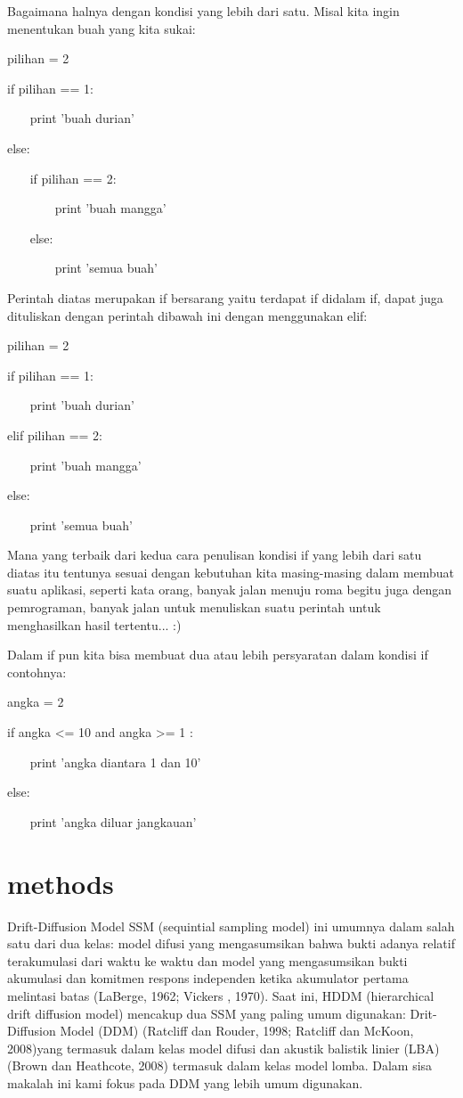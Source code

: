  
Bagaimana halnya dengan kondisi yang lebih dari satu. Misal kita ingin menentukan buah yang kita sukai: 

 
pilihan = 2 

 
if pilihan == 1: 

 
~~~ print 'buah durian' 

 
else: 

 
~~~ if pilihan == 2: 

 
~~~~~~~ print 'buah mangga' 

 
~~~ else: 

 
~~~~~~~ print 'semua buah' 

 
Perintah diatas merupakan if bersarang yaitu terdapat if didalam if, dapat juga dituliskan dengan perintah dibawah ini dengan menggunakan   elif: 

 
pilihan = 2 

 
if pilihan == 1: 

 
~~~ print 'buah durian' 

 
elif pilihan == 2: 

 
~~~ print 'buah mangga' 

 
else: 

 
~~~ print 'semua buah' 

 
Mana yang terbaik dari kedua cara penulisan kondisi if yang lebih dari satu diatas itu tentunya sesuai dengan kebutuhan kita masing-masing dalam membuat suatu aplikasi, seperti kata orang, banyak jalan menuju roma begitu juga dengan pemrograman, banyak jalan untuk menuliskan suatu perintah untuk menghasilkan hasil tertentu... :) 

 
Dalam if pun kita bisa membuat dua atau lebih persyaratan dalam kondisi   if   contohnya: 

 
angka = 2 

 
if angka <= 10 and angka >= 1 : 

 
~~~ print 'angka diantara 1 dan 10' 

 
else: 

 
~~~ print 'angka diluar jangkauan' 

\section {methods}
Drift-Diffusion Model
SSM (sequintial sampling model) ini umumnya dalam salah satu dari dua kelas: 
model difusi yang mengasumsikan bahwa bukti adanya relatif terakumulasi dari waktu ke waktu dan model yang mengasumsikan bukti
akumulasi dan komitmen respons independen ketika akumulator pertama melintasi batas (LaBerge, 1962; Vickers , 1970). 
Saat ini, HDDM (hierarchical drift diffusion model) mencakup dua SSM yang paling umum digunakan: Drit-Diffusion Model (DDM)
(Ratcliff dan Rouder, 1998; Ratcliff dan McKoon, 2008)yang termasuk dalam kelas model difusi dan akustik balistik linier (LBA) 
(Brown dan Heathcote, 2008) termasuk dalam kelas model lomba. Dalam sisa makalah ini kami fokus pada DDM yang lebih umum digunakan.

